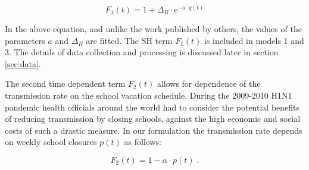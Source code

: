 \documentclass[a4paper]{article}
\begin{document}
\begin{equation}
F_1(t) = 1+\Delta_{R}\cdot{\mathrm{e}^{-a \cdot q(t)}}
\label{eq:sh}
\end{equation}

In the above equation, and unlike the work published by others, the values of the parameters $a$ and $\Delta_{R}$ are fitted. The SH term $F_1(t)$ is included in models 1 and 3.  The details of data collection and processing is discussed later in section \ref{sec:data}.

The second time dependent term $F_2(t)$ allows for dependence of the transmission rate on the school vacation schedule.  During the 2009-2010 H1N1 pandemic health officials around the world had to consider the potential benefits of reducing transmission by closing schools, against the high economic and social costs of such a drastic measure.  In our formulation the transmission rate depends on weekly school closures $p(t)$ as follows:

\begin{equation}
  F_2(t) = 1 - \alpha \cdot p(t) \;.
\end{equation}
\end{document}
